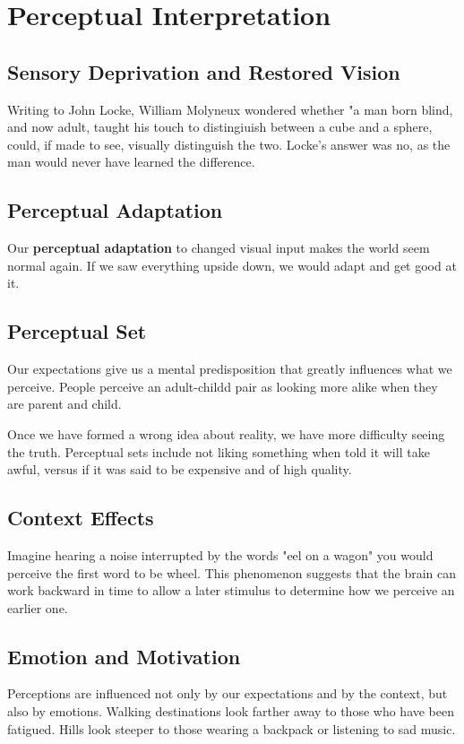 \documentclass[12pt]{article}
\begin{document}
\section*{Perceptual Interpretation}
\subsection*{Sensory Deprivation and Restored Vision}
Writing to John Locke, William Molyneux wondered whether "a man born blind, and now adult, taught his touch to distingiuish between a cube and a sphere, could, if made to see, visually distinguish the two. Locke's answer was no, as the man would never have learned the difference.

\subsection*{Perceptual Adaptation}
Our \textbf{perceptual adaptation} to changed visual input makes the world seem normal again. If we saw everything upside down, we would adapt and get good at it.

\subsection*{Perceptual Set}
Our expectations give us a mental predisposition that greatly influences what we perceive. People perceive an adult-childd pair as looking more alike when they are parent and child.

Once we have formed a wrong idea about reality, we have more difficulty seeing the truth. Perceptual sets include not liking something when told it will take awful, versus if it was said to be expensive and of high quality.

\subsection*{Context Effects}
Imagine hearing a noise interrupted by the words "eel on a wagon" you would perceive the first word to be wheel. This phenomenon suggests that the brain can work backward in time to allow a later stimulus to determine how we perceive an earlier one. 

\subsection*{Emotion and Motivation}
Perceptions are influenced not only by our expectations and by the context, but also by emotions. Walking destinations look farther away to those who have been fatigued. Hills look steeper to those wearing a backpack or listening to sad music.
\end{document}
